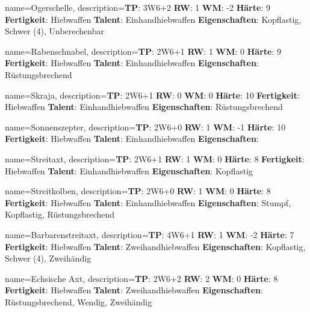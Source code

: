 {
    name={Ogerschelle},
    description={\textbf{TP}: 3W6+2 \textbf{RW}: 1 \textbf{WM}: -2 \textbf{Härte}: 9        \textbf{Fertigkeit}: Hiebwaffen \textbf{Talent}: Einhandhiebwaffen \textbf{{Eigenschaften}}: Kopflastig, Schwer (4), Unberechenbar}
}



{
    name={Rabenschnabel},
    description={\textbf{TP}: 2W6+1 \textbf{RW}: 1 \textbf{WM}: 0 \textbf{Härte}: 9        \textbf{Fertigkeit}: Hiebwaffen \textbf{Talent}: Einhandhiebwaffen \textbf{{Eigenschaften}}: Rüstungsbrechend}
}



{
    name={Skraja},
    description={\textbf{TP}: 2W6+1 \textbf{RW}: 0 \textbf{WM}: 0 \textbf{Härte}: 10        \textbf{Fertigkeit}: Hiebwaffen \textbf{Talent}: Einhandhiebwaffen \textbf{{Eigenschaften}}: Rüstungsbrechend}
}



{
    name={Sonnenszepter},
    description={\textbf{TP}: 2W6+0 \textbf{RW}: 1 \textbf{WM}: -1 \textbf{Härte}: 10        \textbf{Fertigkeit}: Hiebwaffen \textbf{Talent}: Einhandhiebwaffen \textbf{{Eigenschaften}}: }
}



{
    name={Streitaxt},
    description={\textbf{TP}: 2W6+1 \textbf{RW}: 1 \textbf{WM}: 0 \textbf{Härte}: 8        \textbf{Fertigkeit}: Hiebwaffen \textbf{Talent}: Einhandhiebwaffen \textbf{{Eigenschaften}}: Kopflastig}
}



{
    name={Streitkolben},
    description={\textbf{TP}: 2W6+0 \textbf{RW}: 1 \textbf{WM}: 0 \textbf{Härte}: 8        \textbf{Fertigkeit}: Hiebwaffen \textbf{Talent}: Einhandhiebwaffen \textbf{{Eigenschaften}}: Stumpf, Kopflastig, Rüstungsbrechend}
}



{
    name={Barbarenstreitaxt},
    description={\textbf{TP}: 4W6+1 \textbf{RW}: 1 \textbf{WM}: -2 \textbf{Härte}: 7        \textbf{Fertigkeit}: Hiebwaffen \textbf{Talent}: Zweihandhiebwaffen \textbf{{Eigenschaften}}: Kopflastig, Schwer (4), Zweihändig}
}



{
    name={Echsische Axt},
    description={\textbf{TP}: 2W6+2 \textbf{RW}: 2 \textbf{WM}: 0 \textbf{Härte}: 8        \textbf{Fertigkeit}: Hiebwaffen \textbf{Talent}: Zweihandhiebwaffen \textbf{{Eigenschaften}}: Rüstungsbrechend, Wendig, Zweihändig}
}



